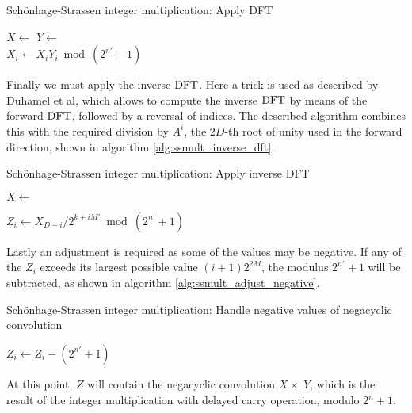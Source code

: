 \begin{algorithm}
		\caption{Schönhage-Strassen integer multiplication: Apply DFT}
		\begin{algorithmic}[1]
				\State $X \gets$ 
				\State $Y \gets$ 
				\\
				\State $X_i \gets X_i Y_i \bmod(2^{n'} + 1)$
				\EndFor
		\end{algorithmic}
		\label{alg:ssmult_dft}
\end{algorithm}

Finally we must apply the inverse $\operatorname{DFT}$. Here a trick is used as described by
Duhamel et al\autocite{duhamelComputingInverseDFT1988}, which allows to compute
the inverse $\operatorname{DFT}$ by means of the forward $\operatorname{DFT}$, followed by a reversal of
indices. The described algorithm combines this with the required division by
$A^i$, the $2D$-th root of unity used in the forward direction, shown in
algorithm \ref{alg:ssmult_inverse_dft}.

\begin{algorithm}
		\caption{Schönhage-Strassen integer multiplication: Apply inverse DFT}
		\begin{algorithmic}[1]
				\State $X \gets$ 

				\State $Z_i \gets X_{D - i} / 2^{k + iM'} \bmod (2^{n'} + 1)$
		\end{algorithmic}
		\label{alg:ssmult_inverse_dft}
\end{algorithm}

Lastly an adjustment is required as some of the values may be negative. If any
of the $Z_i$ exceeds its largest possible value $(i + 1) 2^{2M}$, the modulus
$2^{n'} + 1$ will be subtracted, as shown in algorithm
\ref{alg:ssmult_adjust_negative}.

\begin{algorithm}
		\caption{Schönhage-Strassen integer multiplication: Handle negative values of negacyclic convolution}
		\begin{algorithmic}[1]
				\State $Z_i \gets Z_i - (2^{n'} + 1)$
				\EndIf
				\EndFor
		\end{algorithmic}
		\label{alg:ssmult_adjust_negative}
\end{algorithm}

At this point, $Z$ will contain the negacyclic convolution $X \times_{\_} Y$,
which is the result of the integer multiplication with delayed carry operation,
modulo $2^{n} + 1$.

